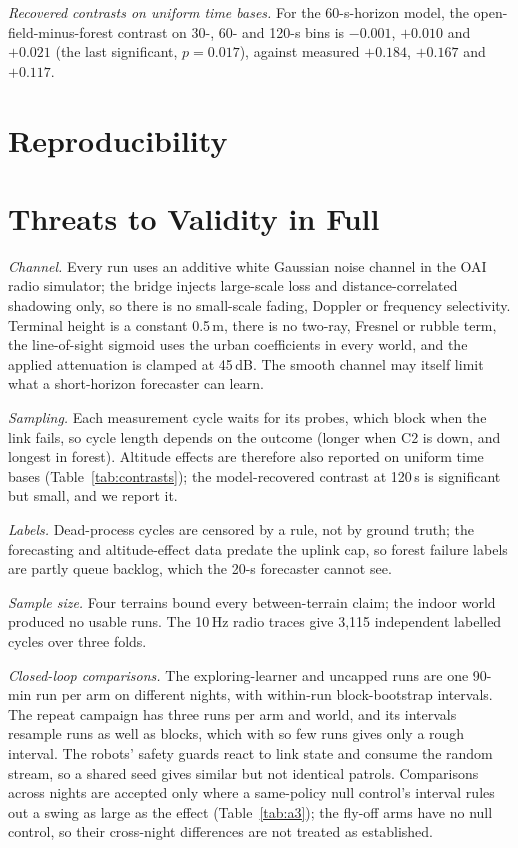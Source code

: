 \textit{Recovered contrasts on uniform time bases.} For the 60-s-horizon model,
the open-field-minus-forest contrast on 30-, 60- and 120-s bins is $-0.001$,
$+0.010$ and $+0.021$ (the last significant, $p = 0.017$), against measured
$+0.184$, $+0.167$ and $+0.117$.

\section{Reproducibility}
\label{app:repro}

\section{Threats to Validity in Full}
\label{app:threats}
\textit{Channel.} Every run uses an additive white Gaussian noise channel in the
OAI radio simulator; the bridge injects large-scale loss and distance-correlated
shadowing only, so there is no small-scale fading, Doppler or frequency
selectivity. Terminal height is a constant 0.5\,m, there is no two-ray, Fresnel
or rubble term, the line-of-sight sigmoid uses the urban coefficients in every
world, and the applied attenuation is clamped at 45\,dB. The smooth channel may
itself limit what a short-horizon forecaster can learn.

\textit{Sampling.} Each measurement cycle waits for its probes, which block when
the link fails, so cycle length depends on the outcome (longer when C2 is down,
and longest in forest). Altitude effects are therefore also reported on uniform
time bases (Table~\ref{tab:contrasts}); the model-recovered contrast at 120\,s
is significant but small, and we report it.

\textit{Labels.} Dead-process cycles are censored by a rule, not by ground truth;
the forecasting and altitude-effect data predate the uplink cap, so forest
failure labels are partly queue backlog, which the 20-s forecaster cannot see.

\textit{Sample size.} Four terrains bound every between-terrain claim; the
indoor world produced no usable runs. The 10\,Hz radio traces give 3,115
independent labelled cycles over three folds.

\textit{Closed-loop comparisons.} The exploring-learner and uncapped runs are
one 90-min run per arm on different nights, with within-run block-bootstrap
intervals. The repeat campaign has three runs per arm and world, and
its intervals resample runs as well as blocks, which with so few runs gives
only a rough interval. The robots'
safety guards react to link state and consume the random stream, so a shared
seed gives similar but not identical patrols. Comparisons across nights are
accepted only where a same-policy null control's interval rules out a swing
as large as the effect (Table~\ref{tab:a3}); the fly-off arms have no null
control, so their cross-night differences are not treated as established.


